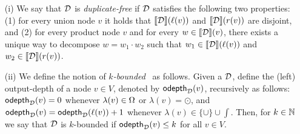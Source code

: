 \begin{enumerate}
	\item[(i)] We say that $\mathcal{D}$ is \emph{duplicate-free} if $\mathcal{D}$ satisfies the following two properties: (1) for every union node $v$ it holds that ${\llbracket{\mathcal{D}}\rrbracket}(\ell(v))$ and ${\llbracket{\mathcal{D}}\rrbracket}(r(v))$ are disjoint, and (2) for every product node $v$ and for every $w \in {\llbracket{\mathcal{D}}\rrbracket}(v)$, there exists a unique way to decompose $w = w_1 \cdot w_2$ such that $w_1 \in {\llbracket{\mathcal{D}}\rrbracket}(\ell(v))$ and $w_2 \in {\llbracket{\mathcal{D}}\rrbracket}(r(v))$. 
	
	\item[(ii)] We define the notion of \emph{$k$-bounded}~\dsabbr{} as follows. 
	Given a \dsabbr{} $\mathcal{D}$, define the (left) output-depth of a node $v\in V$, denoted by $\mathsf{odepth}_{\mathcal{D}}(v)$, recursively as follows:
	$\mathsf{odepth}_{\mathcal{D}}(v) = 0$ whenever $\lambda(v)\in\Omega$ or $\lambda(v) = \odot$, and $\mathsf{odepth}_{\mathcal{D}}(v) = \mathsf{odepth}_{\mathcal{D}}(\ell(v))+1$ whenever $\lambda(v) \in \{\cup\}\cup\int$.
	Then, for $k\in\mathbb{N}$ we say that 
	$\mathcal{D}$ is $k$-bounded if $\mathsf{odepth}_{\mathcal{D}}(v)\leq k$ for all $v\in V$.
\end{enumerate}


%

